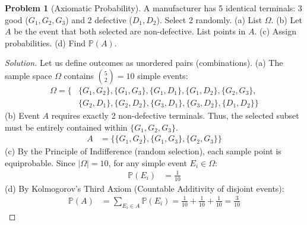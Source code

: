 \documentclass[11pt, letterpaper]{article}
\theoremstyle{definition}
\newtheorem{example}{Problem}
\theoremstyle{remark}
\newcommand{\Prob}{\mathbb{P}}
\begin{document}
\begin{example}[Axiomatic Probability]
    A manufacturer has 5 identical terminals: 3 good ($G_1, G_2, G_3$) and 2 defective ($D_1, D_2$). Select 2 randomly. 
    (a) List $\Omega$. 
    (b) Let $A$ be the event that both selected are non-defective. List points in $A$. 
    (c) Assign probabilities. 
    (d) Find $\Prob(A)$.
\end{example}
\begin{proof}[Solution]
    Let us define outcomes as unordered pairs (combinations).
    (a) The sample space $\Omega$ contains $\binom{5}{2} = 10$ simple events:
    \begin{align*}
        \Omega = \{ &\{G_1, G_2\}, \{G_1, G_3\}, \{G_1, D_1\}, \{G_1, D_2\}, \{G_2, G_3\}, \\
        & \{G_2, D_1\}, \{G_2, D_2\}, \{G_3, D_1\}, \{G_3, D_2\}, \{D_1, D_2\} \}
    \end{align*}
    (b) Event $A$ requires exactly 2 non-defective terminals. Thus, the selected subset must be entirely contained within $\{G_1, G_2, G_3\}$.
    \begin{align*}
        A &= \{ \{G_1, G_2\}, \{G_1, G_3\}, \{G_2, G_3\} \}
    \end{align*}
    (c) By the Principle of Indifference (random selection), each sample point is equiprobable. Since $|\Omega| = 10$, for any simple event $E_i \in \Omega$:
    \begin{align*}
        \Prob(E_i) &= \frac{1}{10}
    \end{align*}
    (d) By Kolmogorov's Third Axiom (Countable Additivity of disjoint events):
    \begin{align*}
        \Prob(A) &= \sum_{E_i \in A} \Prob(E_i) = \frac{1}{10} + \frac{1}{10} + \frac{1}{10} = \frac{3}{10}
    \end{align*}
\end{proof}
\end{document}
